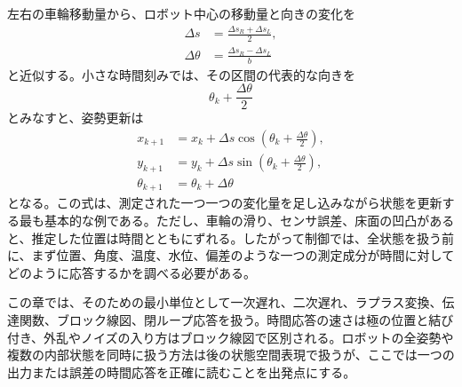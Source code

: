 左右の車輪移動量から、ロボット中心の移動量と向きの変化を
\begin{align}
  \Delta s&=\frac{\Delta s_R+\Delta s_L}{2},
  \label{eq:odometry-increments}\\
  \Delta\theta&=\frac{\Delta s_R-\Delta s_L}{b}
\end{align}
と近似する。小さな時間刻みでは、その区間の代表的な向きを
\begin{equation}
  \theta_k+\frac{\Delta\theta}{2}
\end{equation}
とみなすと、姿勢更新は
\begin{align}
  x_{k+1}&=x_k+\Delta s\cos\left(\theta_k+\frac{\Delta\theta}{2}\right),\\
  y_{k+1}&=y_k+\Delta s\sin\left(\theta_k+\frac{\Delta\theta}{2}\right),\\
  \theta_{k+1}&=\theta_k+\Delta\theta
  \label{eq:odometry-pose-update}
\end{align}
となる。この式は、測定された一つ一つの変化量を足し込みながら状態を更新する最も基本的な例である。ただし、車輪の滑り、センサ誤差、床面の凹凸があると、推定した位置は時間とともにずれる。したがって制御では、全状態を扱う前に、まず位置、角度、温度、水位、偏差のような一つの測定成分が時間に対してどのように応答するかを調べる必要がある。

この章では、そのための最小単位として一次遅れ、二次遅れ、ラプラス変換、伝達関数、ブロック線図、閉ループ応答を扱う。時間応答の速さは極の位置と結び付き、外乱やノイズの入り方はブロック線図で区別される。ロボットの全姿勢や複数の内部状態を同時に扱う方法は後の状態空間表現で扱うが、ここでは一つの出力または誤差の時間応答を正確に読むことを出発点にする。






